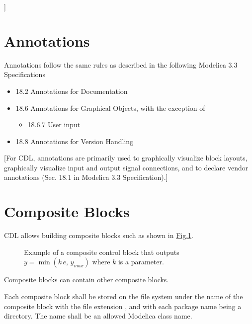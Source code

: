 \documentclass[letterpaper,10pt, openany,english]{sphinxmanual}
\let\sphinxpxdimen\pdfpxdimen\else\newdimen\sphinxpxdimen
\begin{document}
{]}


\section{Annotations}
\label{\detokenize{cdl:annotations}}\label{\detokenize{cdl:sec-annotations}}
Annotations follow the same rules as described in the following
Modelica 3.3 Specifications
\begin{itemize}
\item {} 
18.2 Annotations for Documentation

\item {} 
18.6 Annotations for Graphical Objects, with the exception of
\begin{itemize}
\item {} 
18.6.7 User input

\end{itemize}

\item {} 
18.8 Annotations for Version Handling

\end{itemize}

{[}For CDL, annotations are primarily used to graphically visualize block layouts, graphically visualize
input and output signal connections, and to declare
vendor annotations (Sec. 18.1 in Modelica 3.3 Specification).{]}


\section{Composite Blocks}
\label{\detokenize{cdl:composite-blocks}}\label{\detokenize{cdl:sec-com-blo}}
CDL allows building composite blocks such as shown in
\hyperref[\detokenize{cdl:fig-custom-control-block}]{Fig.\@ \ref{\detokenize{cdl:fig-custom-control-block}}}.

\begin{figure}[htbp]
\centering
\capstart

\noindent\sphinxincludegraphics[width=500\sphinxpxdimen]{{CustomPWithLimiter}.pdf}
\caption{Example of a composite control block that outputs \(y = \min( k \, e, \, y_{max})\)
where \(k\) is a parameter.}\label{\detokenize{cdl:id3}}\label{\detokenize{cdl:fig-custom-control-block}}\end{figure}

Composite blocks can contain other composite blocks.

Each composite block shall be stored on the file system under the name of the composite block
with the file extension , and with each package name being a directory.
The name shall be an allowed Modelica class name.
\end{document}
